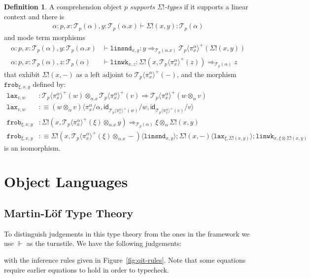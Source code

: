 \documentclass[10pt]{article}
\theoremstyle{definition}
\newtheorem{definition}{Definition}
\newcommand{\yields}{\vdash}
\newcommand{\tcell}{\Rightarrow}
\newcommand{\CTX}{\,\,\mathsf{Ctx}}
\newcommand{\TYPE}{\,\,\mathsf{Type}}
\newcommand{\id}{\mathsf{id}}
\newcommand\TrPlus[2]{\ensuremath{{#1}^+(#2)}}
\newcommand\El[2]{\mathcal{T}_{#1}(#2)}
\newcommand\ApEl[2]{\mathcal{T}_{#1}\langle#2\rangle}
\newcommand\ap[2]{\ensuremath{#1 \langle #2 \rangle }}
\newcommand{\qyields}{\Vdash}
\newcommand{\linsnd}[1]{\mathtt{linsnd}_{#1}}
\newcommand{\linwk}[1]{\mathtt{linwk}_{#1}}
\newcommand{\frob}[1]{\mathtt{frob}_{#1}}
\begin{document}
\begin{definition}
A comprehension object $p$ \emph{supports $\Sigma!$-types} if it supports a linear context and there is
\begin{align*}
\alpha : p, x : \El{p}{\alpha}, y : \El{p}{\alpha.x} \yields \Sigma!(x,y) : \El{p}{\alpha}
\end{align*}
and mode term morphisms
\begin{align*}
\alpha : p, x : \El{p}{\alpha}, y : \El{p}{\alpha.x} &\yields \linsnd{x,y} : y \tcell_{\El{p}{\alpha.x}} \TrPlus{\ApEl{p}{\pi^\alpha_x}}{\Sigma!(x,y)} \\
\alpha : p, x : \El{p}{\alpha}, z : \El{p}{\alpha} &\yields \linwk{x,z} : \Sigma!(x, \TrPlus{\ApEl{p}{\pi^\alpha_x}}{z}) \tcell_{\El{p}{\alpha}} z
\end{align*}
that exhibit $\Sigma!(x,-)$ as a left adjoint to $\TrPlus{\ApEl{p}{\pi^\alpha_x}}{-}$, and the morphism $\frob{\xi, x, y}$ defined by:
\begin{align*}
\mathtt{lax}_{v,w} &: \TrPlus{\ApEl{p}{\pi^\alpha_x}}{w} \otimes_{\alpha.x} \TrPlus{\ApEl{p}{\pi^\alpha_x}}{v} \tcell \TrPlus{\ApEl{p}{\pi^\alpha_x}}{w \otimes_\alpha v} \\
\mathtt{lax}_{v,w} &:\equiv \ap{(w \otimes_\alpha v)}{\pi^\alpha_x / \alpha, \id_{\TrPlus{\ApEl{p}{\pi^\alpha_x}}{w}}/w, \id_{\TrPlus{\ApEl{p}{\pi^\alpha_x}}{v}}/v} \\
\frob{\xi, x, y} &: \Sigma!(x, \TrPlus{\ApEl{p}{\pi^\alpha_x}}{\xi} \otimes_{\alpha.x} y) \tcell_{\El{p}{\alpha}} \xi \otimes_\alpha \Sigma!(x, y) \\
\frob{\xi, x, y} &:\equiv \ap{\Sigma!(x, \TrPlus{\ApEl{p}{\pi^\alpha_x}}{\xi} \otimes_{\alpha.x} -)}{\linsnd{x,y}} ; \ap{\Sigma!(x, -)}{\mathtt{lax}_{\xi, \Sigma!(x,y)}} ; \linwk{x, \xi \otimes \Sigma!(x,y)}
\end{align*}
is an isomorphism.
\end{definition}

\section{Object Languages}

\subsection{Martin-L\"of Type Theory}

To distinguish judgements in this type theory from the ones in the framework we use $\qyields$ as the turnstile. We have the following judgements:
with the inference rules given in Figure~\ref{fig:qit-rules}. Note that some equations require earlier equations to hold in order to typecheck.
\end{document}
